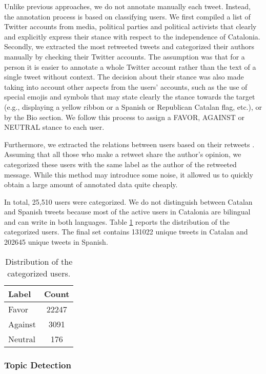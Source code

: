 \documentclass[10pt, a4paper]{article}
\begin{document}
Unlike previous approaches, we do not annotate manually each tweet. Instead, the annotation process is based on classifying users. We first compiled a list of Twitter accounts from media, political parties and political activists that clearly and explicitly express their stance with respect to the independence of Catalonia. Secondly, we extracted the most retweeted tweets and categorized their authors manually by checking their Twitter accounts. The assumption was that for a person it is easier to annotate a whole Twitter account rather than the text of a single tweet without context. The decision about their stance was also made taking into account other aspects from the users' accounts, such as the use of special emojis and symbols that may state clearly the stance towards the target (e.g., displaying a yellow ribbon or a Spanish or Republican Catalan flag, etc.), or by the Bio section. We follow this process to assign a FAVOR, AGAINST or NEUTRAL stance to each user.

Furthermore, we extracted the relations between users based on their retweets \cite{SNA2002}. Assuming that all those who make a retweet share the author's opinion, we categorized these users with the same label as the author of the retweeted message. While this method may introduce some noise, it allowed us to quickly obtain a large amount of annotated data quite cheaply.

In total, 25,510 users were categorized. We do not distinguish between Catalan and Spanish tweets because most of the active users in Catalonia are bilingual and can write in both languages. Table \ref{table:users} reports the distribution of the categorized users. The final set contains 131022 unique tweets in Catalan and 202645 unique tweets in Spanish.

\begin{table}[!ht]
\centering
\begin{tabular}{lc} \hline
      Label & Count \\ \hline
      Favor & 22247 \\
      Against & 3091 \\
     Neutral & 176 \\ \hline
\end{tabular}
\caption{Distribution of the categorized users.}\label{table:users}
\end{table}

\subsubsection{Topic Detection}\label{sec:topic-detection}
\end{document}
